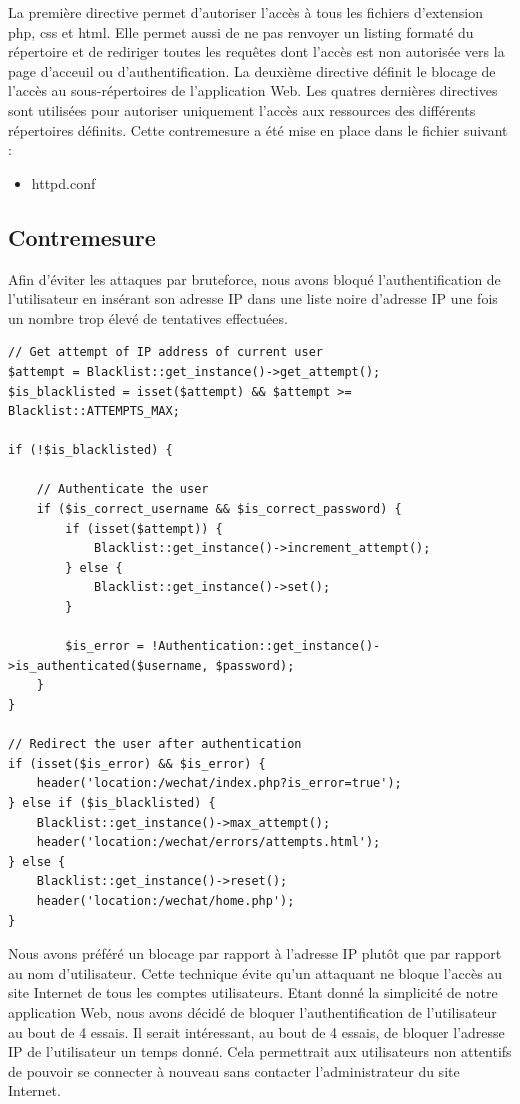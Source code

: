 \documentclass[12pt]{article}
\begin{document}
La première directive permet d'autoriser l'accès à tous les fichiers d'extension php, css et html. Elle permet aussi de ne pas renvoyer un listing formaté du répertoire et de rediriger toutes les requêtes dont l'accès est non autorisée vers la page d'acceuil ou d'authentification. 
La deuxième directive définit le blocage de l'accès au sous-répertoires de l'application Web.
Les quatres dernières directives sont utilisées pour autoriser uniquement l'accès aux ressources des différents répertoires définits.
Cette contremesure a été mise en place dans le fichier suivant :

\begin{itemize}
\item httpd.conf
\end{itemize}

\newpage
\subsection{Contremesure}\label{c6}

Afin d'éviter les attaques par bruteforce, nous avons bloqué l'authentification de l'utilisateur en insérant son adresse IP dans une liste noire d'adresse IP une fois un nombre trop élevé de tentatives effectuées.

\begin{lstlisting}[style=JAVA]
// Get attempt of IP address of current user
$attempt = Blacklist::get_instance()->get_attempt();
$is_blacklisted = isset($attempt) && $attempt >= Blacklist::ATTEMPTS_MAX;

if (!$is_blacklisted) {
    
    // Authenticate the user
    if ($is_correct_username && $is_correct_password) {
        if (isset($attempt)) {
            Blacklist::get_instance()->increment_attempt();
        } else {
            Blacklist::get_instance()->set();
        }

        $is_error = !Authentication::get_instance()->is_authenticated($username, $password);
    }
}

// Redirect the user after authentication
if (isset($is_error) && $is_error) {
    header('location:/wechat/index.php?is_error=true');
} else if ($is_blacklisted) {
    Blacklist::get_instance()->max_attempt();
    header('location:/wechat/errors/attempts.html');
} else {
    Blacklist::get_instance()->reset();
    header('location:/wechat/home.php');
}
\end{lstlisting}

Nous avons préféré un blocage par rapport à l'adresse IP plutôt que par rapport au nom d'utilisateur. Cette technique évite qu'un attaquant ne bloque l'accès au site Internet de tous les comptes utilisateurs. Etant donné la simplicité de notre application Web, nous avons décidé de bloquer l'authentification de l'utilisateur au bout de 4 essais. Il serait intéressant, au bout de 4 essais, de bloquer l'adresse IP de l'utilisateur un temps donné. Cela permettrait aux utilisateurs non attentifs de pouvoir se connecter à nouveau sans contacter l'administrateur du site Internet. 
\end{document}
